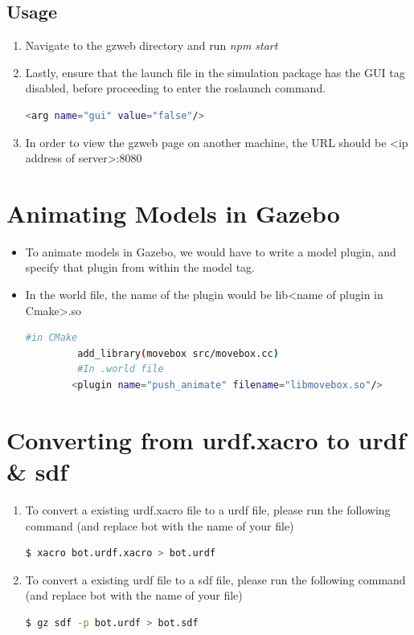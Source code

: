 \documentclass[11pt]{article}
\begin{document}
\subsection{Usage}
\begin{enumerate}

 \item { Navigate to the gzweb directory and run \emph{npm start}}
 \item{
       Lastly, ensure that the launch file in the simulation package has the GUI tag disabled, before proceeding to enter the roslaunch command.
       \begin{lstlisting}[language=bash]
          <arg name="gui" value="false"/>
       \end{lstlisting}
       }
 \item{
       In order to view the gzweb page on another machine, the URL should be <ip address of server>:8080
       }
\end{enumerate}

\section{Animating Models in Gazebo}
\begin{itemize}
 \item {
       To animate models in Gazebo, we would have to write a model plugin, and specify that plugin from within the model tag.
       }
 \item {
       In the world file, the name of the plugin would be
       lib<name of plugin in Cmake>.so
       
       \begin{lstlisting}[language=bash]
         #in CMake
         add_library(movebox src/movebox.cc)
         #In .world file
        <plugin name="push_animate" filename="libmovebox.so"/>
       \end{lstlisting}
       
       }
\end{itemize}
\section{Converting from urdf.xacro to urdf \& sdf}
\begin{enumerate}
 \item {
       To convert a existing urdf.xacro file to a urdf file, please run the following command (and replace
       bot with the name of your file)
       \begin{lstlisting}[language=bash]
$ xacro bot.urdf.xacro > bot.urdf
\end{lstlisting}
       }
 \item {
       To convert a existing urdf file to a sdf file, please run the following command (and replace
       bot with the name of your file)
       \begin{lstlisting}[language=bash]
$ gz sdf -p bot.urdf > bot.sdf
\end{lstlisting}
       }
       
\end{enumerate}
\end{document}
